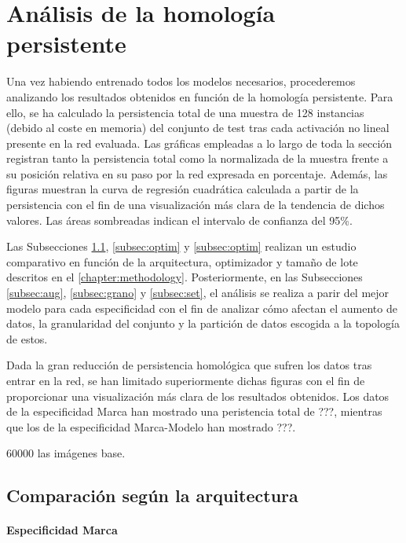\section{Análisis de la homología persistente}
\label{sec:homology-analysis}

Una vez habiendo entrenado todos los modelos necesarios, procederemos analizando los resultados obtenidos en función de la homología persistente. Para ello, se ha calculado la persistencia total de una muestra de 128 instancias (debido al coste en memoria) del conjunto de test tras cada activación no lineal presente en la red evaluada. Las gráficas empleadas a lo largo de toda la sección registran tanto la persistencia total como la normalizada de la muestra frente a su posición relativa en su paso por la red expresada en porcentaje.
Además, las figuras muestran la curva de regresión cuadrática calculada a partir de la persistencia con el fin de una visualización más clara de la tendencia de dichos valores. Las áreas sombreadas indican el intervalo de confianza del 95\%.

Las Subsecciones \ref{subsec:arch}, \ref{subsec:optim} y \ref{subsec:optim} realizan un estudio comparativo en función de la arquitectura, optimizador y tamaño de lote descritos en el \autoref{chapter:methodology}. Posteriormente, en las Subsecciones \ref{subsec:aug}, \ref{subsec:grano} y \ref{subsec:set}, el análisis se realiza a parir del mejor modelo para cada especificidad con el fin de analizar cómo afectan el aumento de datos, la granularidad del conjunto y la partición de datos escogida a la topología de estos.

Dada la gran reducción de persistencia homológica que sufren los datos tras entrar en la red, se han limitado superiormente dichas figuras con el fin de proporcionar una visualización más clara de los resultados obtenidos. Los datos de la especificidad Marca han mostrado una peristencia total de ???, mientras que los de la especificidad Marca-Modelo han mostrado ???.

60000 las imágenes base.

\subsection{Comparación según la arquitectura}
\label{subsec:arch}

\paragraph{Especificidad Marca}

